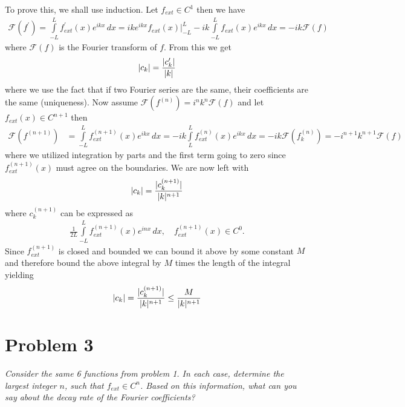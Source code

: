 \documentclass[12pt]{article}
\DeclarePairedDelimiter \abs{\lvert}{\rvert}%
\theoremstyle{remark}
\begin{document}
To prove this, we shall use induction. Let $f_{ext} \in C^1$ then we have
\begin{align*}
	\mathcal{F}(f^\prime) = \int\limits_{-L}^L f_{ext}^\prime(x) e^{ikx} \,dx = ike^{ikx}f_{ext}(x)\bigg\vert_{-L}^L  - ik\int\limits_{-L}^L f_{ext}(x) e^{ikx} \, dx = -ik\mathcal{F}(f)
\end{align*}
where $\mathcal{F}(f)$ is the Fourier transform of $f$. From this we get 
\begin{align*}
	\abs{c_k} = \frac{\abs{c_k^\prime}}{\abs{k}}
\end{align*}
where we use the fact that if two Fourier series are the same, their coefficients are the same (uniqueness). Now assume $\mathcal{F}(f^{(n)}) = i^nk^n \mathcal{F}(f)$ and let $f_{ext}(x) \in C^{n+1}$ then 
\begin{align*}
	\mathcal{F}(f^{(n+1)}) & = \int\limits_{-L}^L f^{(n+1)}_{ext}(x) e^{ikx} \, dx = - ik\int\limits_{L}^L f^{(n)}_{ext}(x) e^{ikx} \, dx = -ik\mathcal{F}(f^{(n)}_k) = -i^{n+1}k^{n+1}\mathcal{F}(f)
\end{align*}
where we utilized integration by parts and the first term going to zero since $f^{(n+1)}_{ext}(x)$ must agree on the boundaries. We are now left with
\begin{align*}
	\abs{c_k} = \frac{\abs{c_k^{(n+1)}}}{\abs{k}^{n+1}}
\end{align*}
where $c_k^{(n+1)}$ can be expressed as
\begin{align*}
	\frac{1}{2L}\int\limits_{-L}^L f_{ext}^{(n+1)}(x)e^{inx} \, dx, \quad f^{(n+1)}_{ext}(x) \in C^0.
\end{align*}
Since $f_{ext}^{(n+1)}$ is closed and bounded we can bound it above by some constant $M$ and therefore bound the above integral by $M$ times the length of the integral yielding
\begin{align*}
	\abs{c_k} = \frac{\abs{c_k^{(n+1)}}}{\abs{k}^{n+1}} \leq \frac{M}{\abs{k}^{n+1}}
\end{align*}

\newpage

\section*{Problem 3}

\textit{Consider the same 6 functions from problem 1. In each case, determine the largest integer $n$, such that $f_{ext} \in C^n$. Based on this information, what can you say about the decay rate of the Fourier coefficients?} \\
\end{document}
